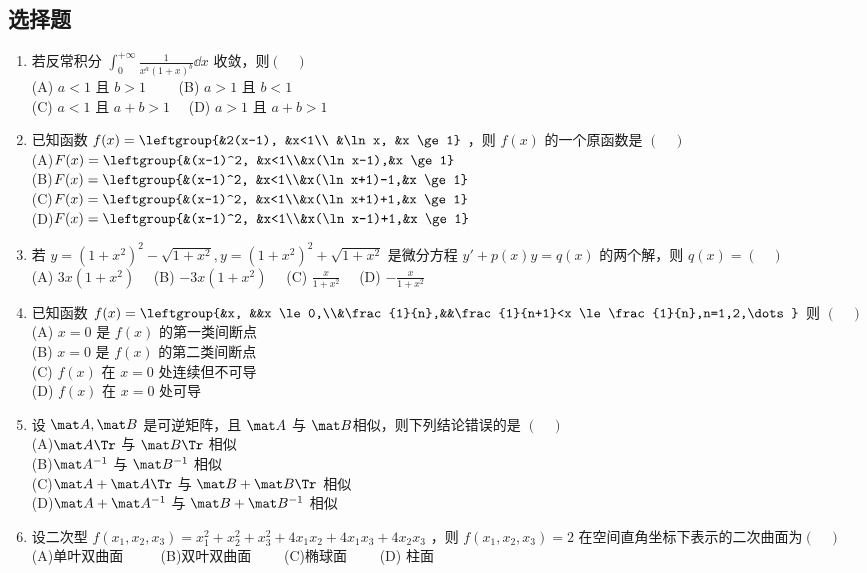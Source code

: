 
\subsection{选择题}

\begin{enumerate}
\item 若反常积分 $\displaystyle \int_{0}^{+\infty} \frac{1}{x^a(1+x)^b}\dd{x}$ 收敛，则$(\quad)$\\
(A) $a<1$ 且 $b>1 \qquad$
(B) $a>1$ 且 $b<1$\\
(C) $a<1$ 且 $a+b>1 \quad$
(D) $a>1$ 且 $a+b>1$
\item 已知函数 $f(x)=\leftgroup{&2(x-1), &x<1\\ &\ln x, &x \ge 1}$ ，则 $f(x)$ 的一个原函数是  $(\quad)$\\
(A)$F(x)=\leftgroup{&(x-1)^2, &x<1\\&x(\ln x-1),&x \ge 1}$\\
(B)$F(x)=\leftgroup{&(x-1)^2, &x<1\\&x(\ln x+1)-1,&x \ge 1}$\\
(C)$F(x)=\leftgroup{&(x-1)^2, &x<1\\&x(\ln x+1)+1,&x \ge 1}$\\
(D)$F(x)=\leftgroup{&(x-1)^2, &x<1\\&x(\ln x-1)+1,&x \ge 1}$\\
\item 若  $y=(1+x^2)^2-\sqrt{1+x^2},y=(1+x^2)^2+\sqrt{1+x^2}$  是微分方程 $y'+p(x)y=q(x)$  的两个解，则 $q(x)= (\quad)$\\
(A) $3x(1+x^2) \quad$
(B) $-3x(1+x^2) \quad$
(C) $\displaystyle \frac{x}{1+x^2} \quad$
(D) $\displaystyle -\frac{x}{1+x^2} \quad$
\item 已知函数 $f(x)=\leftgroup{&x, &&x \le 0,\\&\frac{1}{n},&&\frac{1}{n+1}<x \le \frac{1}{n},n=1,2,\dots}$  则 $(\quad)$\\
(A) $x=0$ 是 $f(x)$  的第一类间断点\\
(B) $x=0$ 是 $f(x)$  的第二类间断点\\
(C) $f(x)$ 在 $x=0$ 处连续但不可导\\
(D) $f(x)$ 在 $x=0$ 处可导
\item  设 $\mat A,\mat B$  是可逆矩阵，且 $\mat A$ 与 $\mat B$相似，则下列结论错误的是 $(\quad)$ \\
(A)$\mat A \Tr$ 与 $\mat B \Tr$ 相似 \\
(B)$\mat A^{-1}$ 与 $\mat B^{-1}$ 相似\\
(C)$\mat A+\mat A \Tr$ 与 $\mat B+\mat B \Tr$ 相似\\
(D)$\mat A +\mat A^{-1}$ 与 $\mat B +\mat B^{-1}$ 相似
\item 设二次型  $f(x_1,x_2,x_3)=x_1^2+x_2^2+x_3^2+4x_1x_2+4x_1x_3+4x_2x_3$  ，则  $f(x_1,x_2,x_3)=2$  在空间直角坐标下表示的二次曲面为$(\quad)$\\
(A)单叶双曲面 $\qquad$
(B)双叶双曲面$\qquad$
(C)椭球面$\qquad$
(D) 柱面


\end{enumerate}
